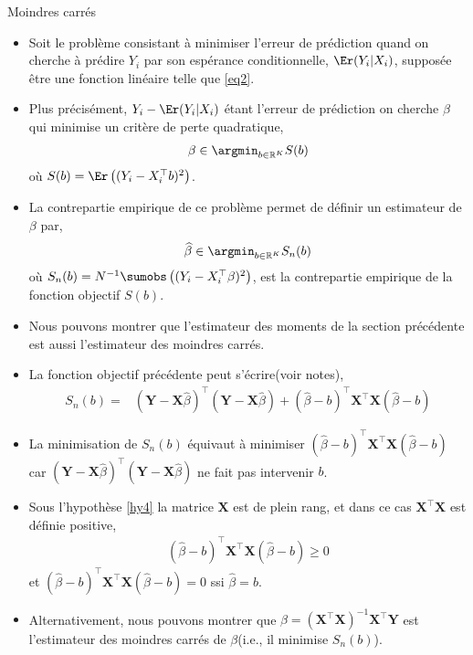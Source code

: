 \begin{frame}[allowframebreaks]{Moindres carrés}
\begin{itemize}
\item Soit le problème consistant à minimiser l'erreur de prédiction quand on cherche à prédire $Y_i$ par son espérance conditionnelle, $\Er(Y_i|X_i)$, supposée être une fonction linéaire telle que \eqref{eq2}. 
\item Plus précisément, $Y_i - \Er(Y_i|X_i)$ étant l'erreur de prédiction  on cherche $\beta$ qui minimise un critère de perte quadratique,
\begin{align*}
\beta \in \argmin_{b\in \mathbb{R}^K}S(b)
\end{align*}
où $S(b) =\Er\left((Y_i - X_i^\top b)^2\right)$.
\item La contrepartie empirique de ce problème permet de définir un estimateur de $\beta$ par,
\begin{align*}
\widehat{\beta} \in \argmin_{b\in \mathbb{R}^K}S_n(b)
\end{align*}
où $S_n(b)=N^{-1}\sumobs\left((Y_i - X_i^\top\beta)^2\right)$, est la contrepartie empirique de la fonction objectif $S(b)$.
\item Nous pouvons montrer que l'estimateur des moments de la section précédente est aussi l'estimateur des moindres carrés.
\item  La fonction objectif précédente peut s'écrire(voir notes),
\begin{align*}
S_n(b) = &(\mathbf{Y} - \mathbf{X}\widehat{\beta})^\top(\mathbf{Y} - \mathbf{X}\widehat{\beta}) + (\widehat{\beta}-b)^\top \mathbf{X}^\top\mathbf{X} (\widehat{\beta}-b) 
\end{align*}
\item La minimisation de $S_n(b)$ équivaut à minimiser $(\widehat{\beta}-b)^\top \mathbf{X}^\top\mathbf{X} (\widehat{\beta}-b)$ car $(\mathbf{Y} - \mathbf{X}\widehat{\beta})^\top(\mathbf{Y} - \mathbf{X}\widehat{\beta})$ ne fait pas intervenir $b$.  
\item Sous l'hypothèse \ref{hy4} la matrice $\mathbf{X}$ est de plein rang, et dans ce cas $\mathbf{X}^\top\mathbf{X}$ est définie positive,
\begin{align*}
(\widehat{\beta}-b)^\top \mathbf{X}^\top\mathbf{X} (\widehat{\beta}-b) \geq 0
\end{align*}
et $(\widehat{\beta}-b)^\top \mathbf{X}^\top\mathbf{X} (\widehat{\beta}-b) = 0$ ssi $\widehat{\beta} = b$.
\item Alternativement, nous pouvons montrer que $\widehat{\beta}=(\mathbf{X}^\top\mathbf{X})^{-1}\mathbf{X}^\top\mathbf{Y}$ est l'estimateur des moindres carrés de $\beta$(i.e., il minimise $S_n(b)$). 

\end{itemize}
\end{frame}
